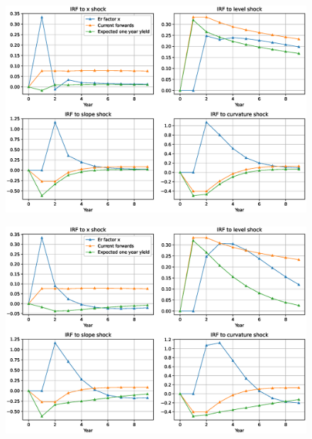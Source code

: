 \documentclass{amsart}
\begin{document}
	\begin{figure}[h!]
		\centering
		\includegraphics[scale=0.5]{fig/eps/Figure9.eps}
	\end{figure}


	\begin{figure}[h!]
		\centering
		\includegraphics[scale=0.5]{fig/eps/Figure10.eps}
	\end{figure}
\end{document}
